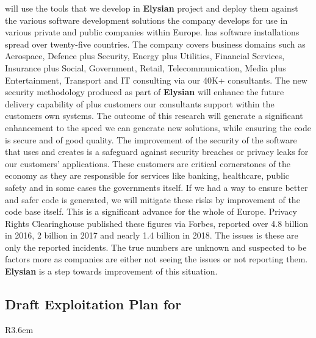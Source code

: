 \documentclass[a4paper,11pt]{article}
\newcommand{\project}[1]{\textbf{#1}\xspace}
\newcommand{\SECURITY}{\project{Elysian}}
\newcommand{\TheProject}{\SECURITY}
\begin{document}
\SOPRAlong{} will use the tools that we develop in \TheProject{} project and deploy them against the various software development solutions the company develops for use in various private and public companies within Europe. \SOPRAshort{} has software installations spread over twenty-five countries. The company covers business domains such as Aerospace, Defence plus Security, Energy plus Utilities, Financial Services, Insurance plus Social, Government, Retail, Telecommunication, Media plus Entertainment, Transport and IT consulting via our 40K+ consultants. The new security methodology produced as part of \TheProject{} will enhance the future delivery capability of \SOPRAshort{} plus customers our consultants support within the customers own systems. The outcome of this research will generate a significant enhancement to the speed we can generate new solutions, while ensuring the code is secure and of good quality. The improvement of the security of the software that \SOPRAlong{} uses and creates is a safeguard against security breaches or privacy leaks for our customers’ applications. These customers are critical cornerstones of the economy as they are responsible for services like banking, healthcare, public safety and in some cases the governments itself. If we had a way to ensure better and safer code is generated, we will mitigate these risks by improvement of the code base itself. This is a significant advance for the whole of Europe. Privacy Rights Clearinghouse published these figures via Forbes, reported over 4.8 billion in 2016, 2 billion in 2017 and nearly 1.4 billion in 2018. The issues is these are only the reported incidents. The true numbers are unknown and suspected to be factors more as companies are either not seeing the issues or not reporting them. {\project{Elysian}} is a step towards improvement of this situation.

\horizontalline

\subsection*{Draft Exploitation Plan for \FRQshort{}}
\vspace{-6pt}

\begin{wrapfigure}{R}{3.6cm}
\vspace{-1.3cm}
\hfill {}
\vspace{-0.8cm}
\end{wrapfigure}
\end{document}
